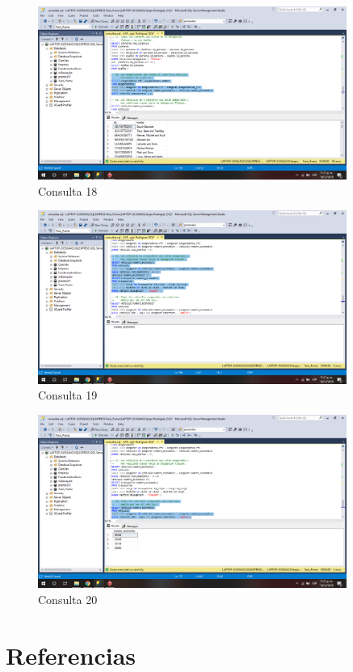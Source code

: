 \documentclass{article}
\begin{document}
\begin{figure}[h]
            \centering
            \includegraphics[width=0.9\textwidth]{img/70.png}
            \caption{Consulta 18}
            \label{fig:my_label18}
        \end{figure}
        
\begin{figure}[h]
            \centering
            \includegraphics[width=0.9\textwidth]{img/71.png}
            \caption{Consulta 19}
            \label{fig:my_label19}
        \end{figure}
        
\begin{figure}[h]
            \centering
            \includegraphics[width=0.9\textwidth]{img/72.png}
            \caption{Consulta 20}
            \label{fig:my_label20}
        \end{figure}
\section{Referencias}
\end{document}
